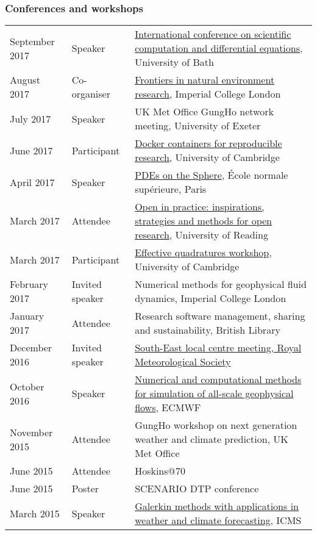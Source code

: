 \documentclass[a4paper,11pt]{article}
\begin{document}
\subsubsection*{Conferences and workshops}
\begin{tabularx}{\linewidth}{l l X}
September 2017 & Speaker & \href{https://sites.google.com/site/scicade2017/}{International conference on scientific computation and differential equations}, University of Bath \\
August 2017 & Co-organiser & \href{https://frontiers2017.wordpress.com/}{Frontiers in natural environment research}, Imperial College London \\
July 2017 & Speaker & UK Met Office GungHo network meeting, University of Exeter \\
June 2017 & Participant & \href{https://www.software.ac.uk/c4rr}{Docker containers for reproducible research}, University of Cambridge \\
April 2017 & Speaker & \href{https://forge.ipsl.jussieu.fr/heat/wiki/PDEs2017}{PDEs on the Sphere}, École normale supérieure, Paris \\
March 2017 & Attendee & \href{https://blogs.reading.ac.uk/open-research/open-in-practice-inspirations-strategies-and-methods-for-open-research/}{Open in practice: inspirations, strategies and methods for open research}, University of Reading \\
March 2017 & Participant & \href{http://www.effective-quadratures.org/eq2017}{Effective quadratures workshop}, University of Cambridge \\
February 2017 & Invited speaker & Numerical methods for geophysical fluid dynamics, Imperial College London \\
January 2017 & Attendee & Research software management, sharing and sustainability, British Library \\
December 2016 & Invited speaker & \href{https://www.rmets.org/events/meteorological-research-within-university-reading-2016}{South-East local centre meeting, Royal Meteorological Society} \\
October 2016 & Speaker & \href{http://www.ecmwf.int/en/learning/workshops-and-seminars/workshop-numerical-and-computational-methods-simulation-all-scale-geophysical-flows}{Numerical and computational methods for simulation of all-scale geophysical flows}, ECMWF \\
November 2015 & Attendee & GungHo workshop on next generation weather and climate prediction, UK Met Office \\
June 2015 & Attendee & Hoskins@70 \\
June 2015 & Poster & SCENARIO DTP conference \\
March 2015 & Speaker & \href{http://www.icms.org.uk/workshop.php?id=334}{Galerkin methods with applications in weather and climate forecasting}, ICMS \\
\end{tabularx}
\end{document}

